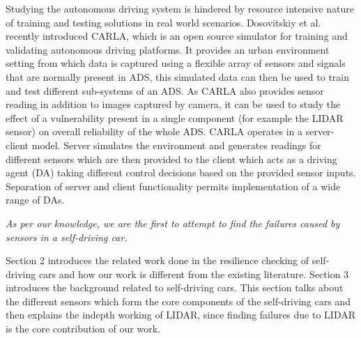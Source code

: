 Studying the autonomous driving system is hindered by resource intensive nature of training and testing solutions in real world scenarios. Dosovitskiy et al.~\cite{carla18corl} recently introduced CARLA, which is an open source simulator for training and validating autonomous driving platforms. It provides an urban environment setting from which data is captured using a flexible array of sensors and signals that are normally present in ADS, this simulated data can then be used to train and test different sub-systems of an ADS. As CARLA also provides sensor reading in addition to images captured by camera, it can be used to study the effect of a vulnerability present in a single component (for example the LIDAR sensor) on overall reliability of the whole ADS. CARLA operates in a server-client model. Server simulates the environment and generates readings for different sensors which are then provided to the client which acts as a driving agent (DA) taking different control decisions based on the provided sensor inputs. Separation of server and client functionality permits implementation of a wide range of DAs.

\emph{As per our knowledge, we are the first to attempt to find the failures caused by sensors in a self-driving car.}

Section 2 introduces the related work done in the resilience checking of self-driving cars and how our work is different from the existing literature. Section 3 introduces the background related to self-driving cars. This section talks about the different sensors which form the core components of the self-driving cars and then explains the indepth working of LIDAR, since finding failures due to LIDAR is the core contribution of our work. 